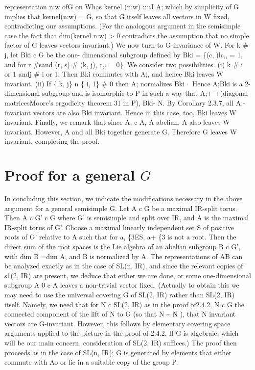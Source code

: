 \documentclass[
]{article}
\begin{document}
representation n:w ofG on Whas kernel (n:w) ::::J A; which by simplicity
of G implies that kernel(n:w) = G, so that G itself leaves all vectors
in W fixed, contradicting our assumptions. (For the analogous argument
in the semisimple case the fact that dim(kernel n:w) \textgreater{} 0
contradicts the assumption that no simple factor of G leaves vectors
invariant.) We now turn to G-invariance of W. For k \# j, let Bki c G be
the one- dimensional subgroup defined by Bki = \{(c,.)lc,, = 1, and for
r \#sand (r, s) \# (k, j), c,. = 0\}. We consider two possibilities. (i)
k \# i or 1 andj \# i or 1. Then Bki commutes with A;, and hence Bki
leaves W invariant. (ii) If \{ k, j\} n \{ i, 1\} \# 0 then A;
normalizes Bki· Hence A;Bki is a 2-dimensional subgroup and is
isomorphic to P in such a way that A;+-+(diagonal matricesMoore's
ergodicity theorem 31 in P), Bki- N. By Corollary 2.3.7, all
A;-invariant vectors are also Bki invariant. Hence in this case, too,
Bki leaves W invariant. Finally, we remark that since A; c A, A abelian,
A also leaves W invariant. However, A and all Bki together generate G.
Therefore G leaves W invariant, completing the proof.









\hypertarget{proof-for-a-general-G}{%
\section{Proof for a general \texorpdfstring{$G$}{G}}\label{proof-for-a-general-G}}



 In concluding this section, we indicate the
modifications necessary in the above argument for a general semisimple
G. Let A c G be a maximal IR-split torus. Then A c G' c G where G' is
semisimple and split over IR, and A is the maximal IR-split torus of G'.
Choose a maximal linearly independent set S of positive roots of G'
relative to A such that for a, \{3ES, a+ \{3 is not a root. Then the
direct sum of the root spaces is the Lie algebra of an abelian subgroup
B c G', with dim B =dim A, and B is normalized by A. The representations
of AB can be analyzed exactly as in the case of SL(n, IR), and since the
relevant copies of s1(2, IR) are present, we deduce that either we are
done, or some one-dimensional subgroup A 0 c A leaves a non-trivial
vector fixed. (Actually to obtain this we may need to use the universal
covering G of SL(2, IR) rather than SL(2, IR) itself. Namely, we need
that for N c SL(2, IR) as in the proof of2.4.2, N c G the connected
component of the lift of N to G (so that N \textasciitilde{} N ), that N
invariant vectors are G-invariant. However, this follows by elementary
covering space arguments applied to the picture in the proof of 2.4.2.
If G is algebraic, which will be our main concern, consideration of
SL(2, IR) suffices.) The proof then proceeds as in the case of SL(n,
IR); G is generated by elements that either commute with Ao or lie in a
suitable copy of the group P.
\end{document}
